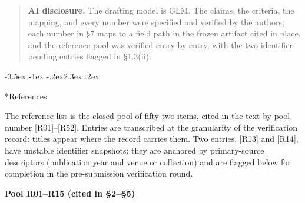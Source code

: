 \documentclass[11pt,a4paper]{article}
\makeatletter
\renewcommand\section{\@startsection{section}{1}{\z@}%
  {-3.5ex \@plus -1ex \@minus -.2ex}{2.3ex \@plus .2ex}%
  {\normalfont\Large\bfseries\raggedright}}
\makeatother
\begin{document}
\begin{abstract}
\textbf{AI disclosure.} The drafting model is GLM. The claims, the criteria, the mapping, and every number were specified and verified by the authors; each number in §7 maps to a field path in the frozen artifact cited in place, and the reference pool was verified entry by entry, with the two identifier-pending entries flagged in §1.3(ii).

\end{abstract}

\section*{References}

The reference list is the closed pool of fifty-two items, cited in the text by pool number [R01]–[R52]. Entries are transcribed at the granularity of the verification record: titles appear where the record carries them. Two entries, [R13] and [R14], have unstable identifier snapshots; they are anchored by primary-source descriptors (publication year and venue or collection) and are flagged below for completion in the pre-submission verification round.

\medskip
\noindent\textbf{Pool R01–R15 (cited in §2–§5)}\par\addvspace{2pt}
\end{document}
